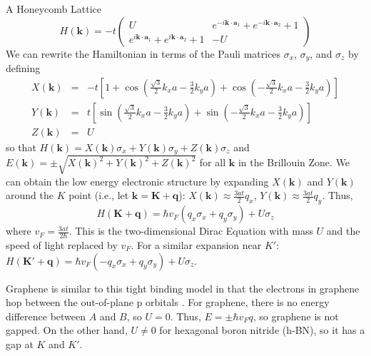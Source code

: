 \documentclass[a4paper,12pt]{article}
\renewcommand{\vec}[1]{\boldsymbol{\mathbf{#1}}}
\begin{document}
\begin{section}{A Honeycomb Lattice}
\begin{equation}
H(\vec{k})= -t \left(
\begin{array}{cc}
U & e^{-i \vec{k} \cdot \vec{a}_1}+e^{-i \vec{k} \cdot \vec{a}_2} +1  \\
e^{i \vec{k} \cdot \vec{a}_1}+e^{i \vec{k} \cdot \vec{a}_2} +1 & -U
\end{array}
\right)
\end{equation}
We can rewrite the Hamiltonian in terms of the Pauli matrices $\sigma_x$, $\sigma_y$, and $\sigma_z$ by defining
\begin{eqnarray}
X(\vec{k}) &=& -t \left[ 1+ \cos \left( \frac{\sqrt{3}}{2}k_x a - \frac{3}{2}k_y a \right) + \cos \left( -\frac{\sqrt{3}}{2}k_x a - \frac{3}{2}k_y a \right) \right] \\
Y(\vec{k}) &=& t \left[ \sin \left( \frac{\sqrt{3}}{2}k_x a - \frac{3}{2}k_y a \right) + \sin \left( -\frac{\sqrt{3}}{2}k_x a - \frac{3}{2}k_y a \right) \right] \\
Z(\vec{k}) &=& U
\end{eqnarray}
so that $H(\vec{k})=X(\vec{k}) \sigma_x + Y(\vec{k}) \sigma_y+Z(\vec{k}) \sigma_z$ and $E(\vec{k})=\pm \sqrt{X(\vec{k})^2+Y(\vec{k})^2+Z(\vec{k})^2}$ for all $\vec{k}$ in the Brillouin Zone.  We can obtain the low energy electronic structure by expanding $X(\vec{k})$ and $Y(\vec{k})$ around the $K$ point (i.e., let $\vec{k}=\vec{K}+\vec{q}$): $X(\vec{k}) \approx \frac{3at}{2} q_x$, $Y(\vec{k}) \approx \frac{3at}{2} q_y$.
Thus,
\begin{equation}
H(\vec{K}+\vec{q})=\hbar v_F \left( q_x \sigma_x + q_y \sigma_y \right) + U \sigma_z
\end{equation}
where $v_F=\frac{3at}{2\hbar}$.  This is the two-dimensional Dirac Equation with mass $U$ and the speed of light replaced by $v_F$.  For a similar expansion near $K'$: $H(\vec{K'}+\vec{q})=\hbar v_F \left( - q_x \sigma_x + q_y \sigma_y \right) + U \sigma_z$.

Graphene is similar to this tight binding model in that the electrons in graphene hop between the out-of-plane p orbitals \cite{castro_neto}.  For graphene, there is no energy difference between $A$ and $B$, so $U=0$.  Thus, $E=\pm \hbar v_F q$, so graphene is not gapped.  On the other hand, $U \ne 0$ for hexagonal boron nitride (h-BN), so it has a gap at $K$ and $K'$.

\end{section}
\end{document}

